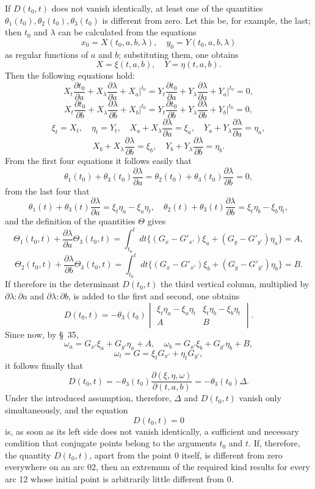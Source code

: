 \documentclass[11pt,a4paper,leqno]{article}
\begin{document}
If $D(t_0,t)$ does not vanish identically, at least one of the quantities $\theta_1(t_0),\theta_2(t_0),\theta_3(t_0)$ is different from zero. Let this be, for example, the last; then $t_0$ and $\lambda$ can be calculated from the equations
\[
x_0=X(t_0,a,b,\lambda),
\quad y_0=Y(t_0,a,b,\lambda)
\]
as regular functions of $a$ and $b$; substituting them, one obtains
\[
X=\xi(t,a,b),
\quad Y=\eta(t,a,b).
\]
Then the following equations hold:
\[
X_t\frac{\partial t_0}{\partial a}+X_\lambda\frac{\partial\lambda}{\partial a}+X_a\bigg|^{t_0}=Y_t\frac{\partial t_0}{\partial a}+Y_\lambda\frac{\partial\lambda}{\partial a}+Y_a\bigg|^{t_0}=0,
\]
\[
X_t\frac{\partial t_0}{\partial b}+X_\lambda\frac{\partial\lambda}{\partial b}+X_b\bigg|^{t_0}=Y_t\frac{\partial t_0}{\partial b}+Y_\lambda\frac{\partial\lambda}{\partial b}+Y_b\bigg|^{t_0}=0,
\]
\[
\xi_t=X_t,
\quad \eta_t=Y_t,
\quad X_a+X_\lambda\frac{\partial\lambda}{\partial a}=\xi_a,
\quad Y_a+Y_\lambda\frac{\partial\lambda}{\partial a}=\eta_a,
\]
\[
X_b+X_\lambda\frac{\partial\lambda}{\partial b}=\xi_b,
\quad Y_b+Y_\lambda\frac{\partial\lambda}{\partial b}=\eta_b.
\]
From the first four equations it follows easily that
\[
\theta_1(t_0)+\theta_3(t_0)\frac{\partial\lambda}{\partial a}=\theta_2(t_0)+\theta_3(t_0)\frac{\partial\lambda}{\partial b}=0,
\]
from the last four that
\[
\theta_1(t)+\theta_3(t)\frac{\partial\lambda}{\partial a}=\xi_t\eta_a-\xi_a\eta_t,
\quad
\theta_2(t)+\theta_3(t)\frac{\partial\lambda}{\partial b}=\xi_t\eta_b-\xi_b\eta_t,
\]
and the definition of the quantities $\Theta$ gives
\[
\Theta_1(t_0,t)+\frac{\partial\lambda}{\partial a}\Theta_3(t_0,t)=
\int_{t_0}^{t}dt\{(G_x-G'_{x'})\xi_a+(G_y-G'_{y'})\eta_a\}=A,
\]
\[
\Theta_2(t_0,t)+\frac{\partial\lambda}{\partial b}\Theta_3(t_0,t)=
\int_{t_0}^{t}dt\{(G_x-G'_{x'})\xi_b+(G_y-G'_{y'})\eta_b\}=B.
\]
If therefore in the determinant $D(t_0,t)$ the third vertical column, multiplied by $\partial\lambda:\partial a$ and $\partial\lambda:\partial b$, is added to the first and second, one obtains
\[
D(t_0,t)=-\theta_3(t_0)\begin{vmatrix}
\xi_t\eta_a-\xi_a\eta_t&\xi_t\eta_b-\xi_b\eta_t\\
A&B
\end{vmatrix}.
\]
Since now, by \S~35,
\[
\omega_a=G_{x'}\xi_a+G_{y'}\eta_a+A,
\quad
\omega_b=G_{x'}\xi_b+G_{y'}\eta_b+B,
\]
\[
\omega_t=G=\xi_tG_{x'}+\eta_tG_{y'},
\]
it follows finally that
\[
D(t_0,t)=-\theta_3(t_0)\frac{\partial(\xi,\eta,\omega)}{\partial(t,a,b)}=-\theta_3(t_0)\Delta.
\]
Under the introduced assumption, therefore, $\Delta$ and $D(t_0,t)$ vanish only simultaneously, and the equation
\[
D(t_0,t)=0
\]
is, as soon as its left side does not vanish identically, a sufficient and necessary condition that conjugate points belong to the arguments $t_0$ and $t$. If, therefore, the quantity $D(t_0,t)$, apart from the point 0 itself, is different from zero everywhere on an arc 02, then an extremum
of the required kind results for every arc 12 whose initial point is arbitrarily little different from 0.
\end{document}
